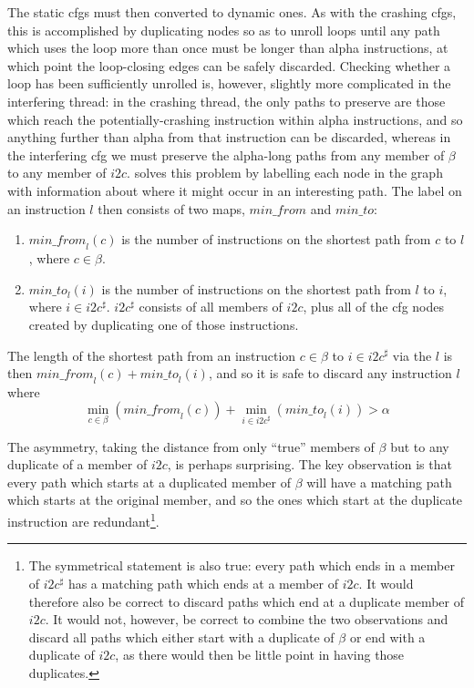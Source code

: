The static \glspl{cfg} must then converted to dynamic ones.  As with
the crashing \glspl{cfg}, this is accomplished by duplicating nodes so
as to unroll loops until any path which uses the loop more than once
must be longer than \gls{alpha} instructions, at which point the
loop-closing edges can be safely discarded.  Checking whether a loop
has been sufficiently unrolled is, however, slightly more complicated
in the interfering thread: in the crashing thread, the only paths to
preserve are those which reach the potentially-crashing instruction
within \gls{alpha} instructions, and so anything further than
\gls{alpha} from that instruction can be discarded, whereas in the
interfering \gls{cfg} we must preserve the \gls{alpha}-long paths from
any member of $\beta$ to any member of $i2c$.  {\Technique} solves
this problem by labelling each node in the graph with information
about where it might occur in an interesting path.  The label on an
instruction $l$ then consists of two maps, $\mathit{min\_from}$ and
$\mathit{min\_to}$:
\vspace{-1pt}
\begin{enumerate}
\item
  $\mathit{min\_from}_l(c)$ is the number of instructions on the
  shortest path from $c$ to $l$, where $c \in \beta$.
\vspace{-12pt}
\item
  $\mathit{min\_to}_l(i)$ is the number of instructions on the
  shortest path from $l$ to $i$, where $i \in i2c^\sharp$.
  $i2c^\sharp$ consists of all members of $i2c$, plus all of the
  \gls{cfg} nodes created by duplicating one of those instructions.
\end{enumerate}
The length of the shortest path from an instruction $c
\in \beta$ to $i \in i2c^\sharp$ via the $l$ is then
$\mathit{min\_from}_l(c) + \mathit{min\_to}_l(i)$, and so it is safe
to discard any instruction $l$ where
\begin{displaymath}
\min_{c \in \beta}\left(\mathit{min\_from}_l(c)\right) + \min_{i \in i2c^\sharp}\left(\mathit{min\_to}_l(i)\right) > \alpha
\end{displaymath}

The asymmetry, taking the distance from only ``true'' members of
$\beta$ but to any duplicate of a member of $i2c$, is perhaps
surprising.  The key observation is that every path which starts at a
duplicated member of $\beta$ will have a matching path which starts at
the original member, and so the ones which start at the duplicate
instruction are redundant\footnote{The symmetrical statement is also
  true: every path which ends in a member of $i2c^\sharp$ has a
  matching path which ends at a member of $i2c$.  It would therefore
  also be correct to discard paths which end at a duplicate member of
  $i2c$.  It would not, however, be correct to combine the two
  observations and discard all paths which either start with a
  duplicate of $\beta$ or end with a duplicate of $i2c$, as there
  would then be little point in having those duplicates.}.

